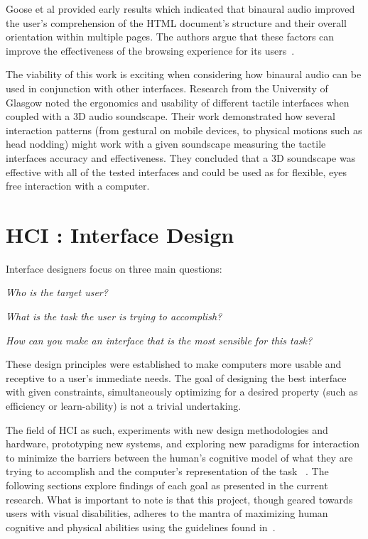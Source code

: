 Goose et al provided early results which indicated that binaural audio
improved the user's comprehension of the HTML document's structure and their
overall orientation within multiple pages.  The authors argue that these
factors can improve the effectiveness of the browsing experience for its
users~\cite{goose19993dAudio}.

The viability of this work is exciting when considering how binaural audio
can be used in conjunction with other interfaces.  Research from the
University of Glasgow noted the ergonomics and usability of different tactile
interfaces when coupled with a 3D audio soundscape.  Their work demonstrated
how several interaction patterns (from gestural on mobile devices, to physical
motions such as head nodding) might work with a given soundscape measuring the
tactile interfaces accuracy and effectiveness.  They concluded that a 3D soundscape
was effective with all of the tested interfaces and could be used as for
flexible, eyes free interaction with a computer\cite{marentakis2004study}.


\section{                 HCI : Interface Design                             }

Interface designers focus on three main questions:

\textit{Who is the target user?}

\textit{What is the task the user is trying to accomplish?}

\textit{How can you make an interface that is the most sensible for this task?}

These design principles were established to make computers more usable and
receptive to a user's immediate needs. The goal of designing the best interface
with given constraints, simultaneously optimizing for a desired property (such
as efficiency or learn-ability) is not a trivial undertaking.

The field of HCI as such, experiments with new design methodologies and
hardware, prototyping new systems, and exploring new paradigms for interaction
to minimize the  barriers between the human's cognitive model of what they are
trying to accomplish and the computer's representation of the task
~\cite{baecker1987human}. The following sections explore findings of each goal
as presented in the current research.  What is important to note is that this
project, though geared towards users with visual disabilities, adheres to
the mantra of maximizing human cognitive and physical abilities using the
guidelines found in~\cite{reeves2004guidelines}.


